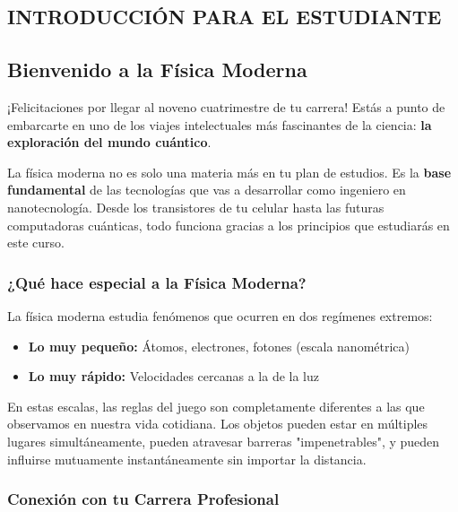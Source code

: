 \begin{tecnologiabox}
\begin{tecnologiabox}
\begin{tecnologiabox}
\begin{teknologiabox}
\begin{tecnologiabox}
\begin{tecnologiabox}
\begin{tecnologiabox}
\newpage

\tableofcontents

\listoftables

\chapter{INTRODUCCIÓN PARA EL ESTUDIANTE}

\section{Bienvenido a la Física Moderna}

¡Felicitaciones por llegar al noveno cuatrimestre de tu carrera! Estás a punto de embarcarte en uno de los viajes intelectuales más fascinantes de la ciencia: \textbf{la exploración del mundo cuántico}.

\begin{consejobox}
La física moderna no es solo una materia más en tu plan de estudios. Es la \textbf{base fundamental} de las tecnologías que vas a desarrollar como ingeniero en nanotecnología. Desde los transistores de tu celular hasta las futuras computadoras cuánticas, todo funciona gracias a los principios que estudiarás en este curso.
\end{consejobox}

\subsection{¿Qué hace especial a la Física Moderna?}

La física moderna estudia fenómenos que ocurren en dos regímenes extremos:

\begin{itemize}
\item \textbf{Lo muy pequeño:} Átomos, electrones, fotones (escala nanométrica)
\item \textbf{Lo muy rápido:} Velocidades cercanas a la de la luz
\end{itemize}

En estas escalas, las reglas del juego son completamente diferentes a las que observamos en nuestra vida cotidiana. Los objetos pueden estar en múltiples lugares simultáneamente, pueden atravesar barreras "impenetrables", y pueden influirse mutuamente instantáneamente sin importar la distancia.

\subsection{Conexión con tu Carrera Profesional}


\end{tecnologiabox}
\end{tecnologiabox}
\end{tecnologiabox}
\end{teknologiabox}
\end{tecnologiabox}
\end{tecnologiabox}
\end{tecnologiabox}
